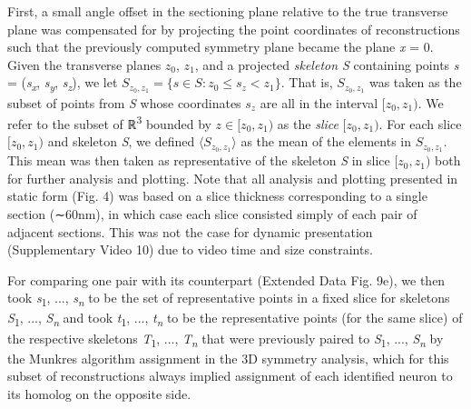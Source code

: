 \documentclass{article}
\begin{document}
First, a small angle offset in the sectioning plane relative to the true transverse plane was compensated for by projecting the point coordinates of reconstructions such that the previously computed symmetry plane became the plane \textit{x} = 0. Given the transverse planes $z_0$, $z_1$, and a projected \textit{skeleton S} containing points \textit{s} = (\textit{s}\textsubscript{\textit{x}}, \textit{s}\textsubscript{\textit{y}}, \textit{s}\textsubscript{\textit{z}}), we let $S_{z_0,z_1} = \{s \in S : z_0 \leq s_z < z_1\}$. That is, $S_{z_0,z_1}$ was taken as the subset of points from \textit{S} whose coordinates $s_z$ are all in the interval $[z_0, z_1)$. We refer to the subset of ℝ\textsuperscript{3} bounded by $z \in [z_0, z_1)$ as the \textit{slice} $[z_0, z_1)$. For each slice $[z_0, z_1)$ and skeleton \textit{S}, we defined $\langle S_{z_0,z_1} \rangle$ as the mean of the elements in $S_{z_0,z_1}$. This mean was then taken as representative of the skeleton \textit{S} in slice $[z_0, z_1)$ both for further analysis and plotting. Note that all analysis and plotting presented in static form (Fig. 4) was based on a slice thickness corresponding to a single section (∼60nm), in which case each slice consisted simply of each pair of adjacent sections. This was not the case for dynamic presentation (Supplementary Video 10) due to video time and size constraints.


For comparing one pair with its counterpart (Extended Data Fig. 9e), we then took \textit{s}\textsubscript{1}, ..., \textit{s}\textsubscript{\textit{n}} to be the set of representative points in a fixed slice for skeletons \textit{S}\textsubscript{1}, ..., \textit{S}\textsubscript{\textit{n}} and took \textit{t}\textsubscript{1}, ..., \textit{t}\textsubscript{\textit{n}} to be the representative points (for the same slice) of the respective skeletons \textit{T}\textsubscript{1}, ..., \textit{T}\textsubscript{\textit{n}} that were previously paired to \textit{S}\textsubscript{1}, ..., \textit{S}\textsubscript{\textit{n}} by the Munkres algorithm assignment in the 3D symmetry analysis, which for this subset of reconstructions always implied assignment of each identified neuron to its homolog on the opposite side.
\end{document}
